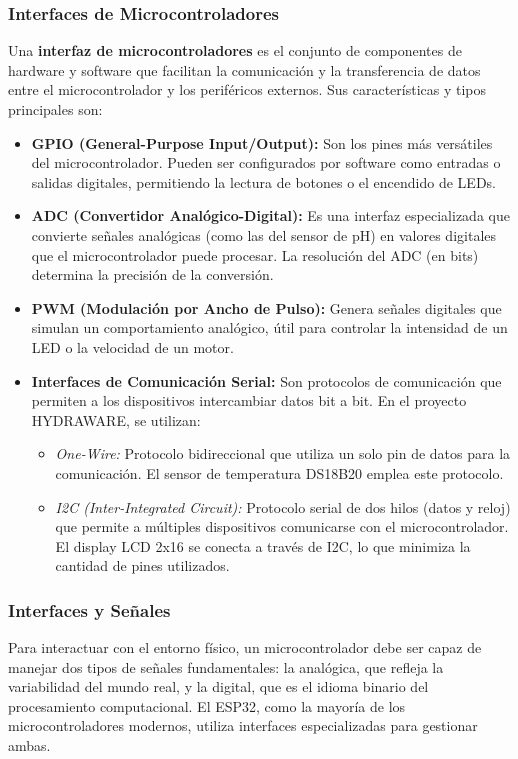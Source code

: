 \documentclass[a4paper,12pt]{article}
\begin{document}
	\subsubsection{Interfaces de Microcontroladores}
	Una \textbf{interfaz de microcontroladores} es el conjunto de componentes de hardware y software que facilitan la comunicación y la transferencia de datos entre el microcontrolador y los periféricos externos. Sus características y tipos principales son:
	
	\begin{itemize}
		\item \textbf{GPIO (General-Purpose Input/Output):} Son los pines más versátiles del microcontrolador. Pueden ser configurados por software como entradas o salidas digitales, permitiendo la lectura de botones o el encendido de LEDs.
		\item \textbf{ADC (Convertidor Analógico-Digital):} Es una interfaz especializada que convierte señales analógicas (como las del sensor de pH) en valores digitales que el microcontrolador puede procesar. La resolución del ADC (en bits) determina la precisión de la conversión.
		\item \textbf{PWM (Modulación por Ancho de Pulso):} Genera señales digitales que simulan un comportamiento analógico, útil para controlar la intensidad de un LED o la velocidad de un motor.
		\item \textbf{Interfaces de Comunicación Serial:} Son protocolos de comunicación que permiten a los dispositivos intercambiar datos bit a bit. En el proyecto HYDRAWARE, se utilizan:
		\begin{itemize}
			\item \textit{One-Wire:} Protocolo bidireccional que utiliza un solo pin de datos para la comunicación. El sensor de temperatura DS18B20 emplea este protocolo.
			\item \textit{I2C (Inter-Integrated Circuit):} Protocolo serial de dos hilos (datos y reloj) que permite a múltiples dispositivos comunicarse con el microcontrolador. El display LCD 2x16 se conecta a través de I2C, lo que minimiza la cantidad de pines utilizados.
		\end{itemize}
	\end{itemize}
	
	\subsubsection{Interfaces y Señales}
	Para interactuar con el entorno físico, un microcontrolador debe ser capaz de manejar dos tipos de señales fundamentales: la analógica, que refleja la variabilidad del mundo real, y la digital, que es el idioma binario del procesamiento computacional. El ESP32, como la mayoría de los microcontroladores modernos, utiliza interfaces especializadas para gestionar ambas.
	
\end{document}
